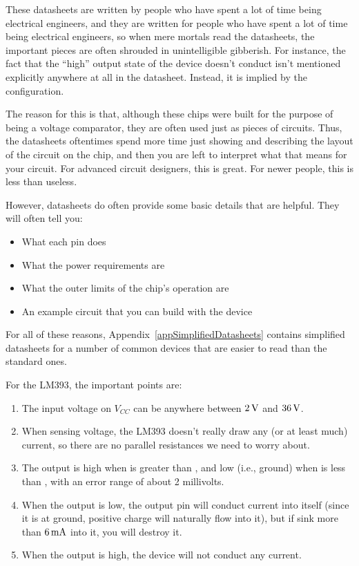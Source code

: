 These datasheets are written by people who have spent a lot of time being electrical engineers, and they are written for people who have spent a lot of time being electrical engineers, so when mere mortals read the datasheets, the important pieces are often shrouded in unintelligible gibberish.
For instance, the fact that the ``high'' output state of the device doesn't conduct isn't mentioned explicitly anywhere at all in the datasheet.  
Instead, it is implied by the configuration.

The reason for this is that, although these chips were built for the purpose of being a voltage comparator, they are often used just as pieces of circuits.
Thus, the datasheets oftentimes spend more time just showing and describing the layout of the circuit on the chip, and then you are left to interpret what that means for your circuit.
For advanced circuit designers, this is great.
For newer people, this is less than useless.

However, datasheets do often provide some basic details that are helpful.
They will often tell you:
\begin{itemize}
\item What each pin does
\item What the power requirements are
\item What the outer limits of the chip's operation are
\item An example circuit that you can build with the device
\end{itemize}

For all of these reasons, Appendix~\ref{appSimplifiedDatasheets} contains simplified datasheets for a number of common devices that are easier to read than the standard ones. 

For the LM393, the important points are:

\begin{enumerate}
\item The input voltage on $V_{CC}$ can be anywhere between $2\,\si{\volt}$ and $36\,\si{\volt}$.
\item When sensing voltage, the LM393 doesn't really draw any (or at least much) current, so there are no parallel resistances we need to worry about.
\item The output is high when  is greater than , and low (i.e., ground) when  is less than , with an error range of about 2 millivolts.
\item When the output is low, the output pin will conduct current into itself (since it is at ground, positive charge will naturally flow into it), but if sink more than $6\,\si{\milli\ampere}$ into it, you will destroy it.
\item When the output is high, the device will not conduct any current.
\end{enumerate}

